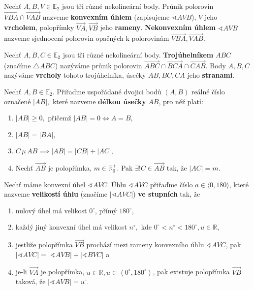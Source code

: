 \begin{definition}\label{uheldef}
  Nechť $A,B,V \in \mathbb E_2$ jsou tři různé nekolineární body. Průnik polorovin $\overrightarrow{VBA} \cap \overrightarrow{VAB}$ nazveme \textbf{konvexním úhlem}
  (zapisujeme $\sphericalangle AVB$), $V$ jeho \textbf{vrcholem}, polopřímky $\overrightarrow{VA}, \overrightarrow{VB}$ jeho \textbf{rameny}.
  \textbf{Nekonvexním úhlem} $\sphericalangle AVB$ nazveme sjednocení polorovin opačných k polorovinám $\overrightarrow{VBA},\overrightarrow{VAB}.$
\end{definition}

\begin{definition}
  Nechť $A,B,C\in \mathbb E_2$ jsou tři různé nekolineární body. \textbf{Trojúhelníkem} $ABC$ (značíme $\triangle ABC$) nazýváme průnik polorovin $\overrightarrow{ABC} \cap \overrightarrow{BCA} \cap \overrightarrow{CAB}$. Body $A,B,C$ nazýváme \textbf{vrcholy} tohoto trojúhelníka, úsečky $AB, BC, CA$ jeho \textbf{stranami}.
\end{definition}

\begin{definition}
  Nechť $A,B\in \mathbb E_2.$ Přiřaďme uspořádané dvojici bodů $(A,B)$ reálné číslo označené $|AB|,$ které nazveme \textbf{délkou úsečky} $AB$, pro něž platí:
  \begin{enumerate}[$i.$]
    \item $|AB|\geq 0,$ přičemž $|AB|=0 \iff A=B,$
    \item $|AB|=|BA|,$
    \item $C\, \mu \, AB \implies |AB|=|CB|+|AC|,$
    \item Nechť $\overrightarrow{AB}$ je polopřímka, $m\in \mathbb R^+_0.$ Pak $\exists ! C\in \overrightarrow{AB}$ tak, že $|AC|=m.$
  \end{enumerate}
\end{definition}

\begin{definition}\label{uhelvel}
  Nechť máme konvexní úhel $\sphericalangle AVC$. Úhlu $\sphericalangle AVC$ přiřaďme číslo $a \in \langle 0, 180 \rangle$, které nazveme \textbf{velikostí úhlu} (značíme $|\sphericalangle AVC|$) \textbf{ve stupních} tak, že
  \begin{enumerate}[$i.$]
    \item nulový úhel má velikost $0^\circ$, přímý $180^\circ$,
    \item každý jiný konvexní úhel má velikost $n^\circ, $ kde $0^\circ< n ^\circ< 180^\circ, u \in \mathbb R,$
    \item jestliže polopřímka $\overrightarrow{VB}$ prochází mezi rameny konvexního úhlu $\sphericalangle AVC$, pak $|\sphericalangle AVC|=|\sphericalangle AVB|+ |\sphericalangle BVC|$ a
    \item je-li $\overrightarrow{VA}$ je polopřímka, $u \in \mathbb R, u \in \left < 0 ^\circ,180^\circ \right >$, pak existuje polopřímka $\overrightarrow{VB}$ taková, že $|\sphericalangle AVB|=u^\circ.$
  \end{enumerate}
\end{definition}


